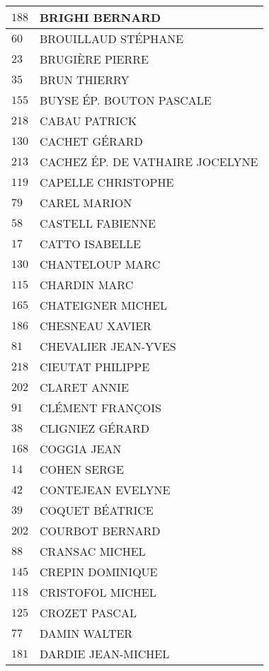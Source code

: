 \begin{xltabular}{\linewidth}{|l|X|}
    \hline
    $188$ & BRIGHI BERNARD \\
    \hline
    $60$ & BROUILLAUD STÉPHANE \\
    \hline
    $23$ & BRUGIÈRE PIERRE \\
    \hline
    $35$ & BRUN THIERRY \\
    \hline
    $155$ & BUYSE ÉP. BOUTON PASCALE \\
    \hline
    $218$ & CABAU PATRICK \\
    \hline
    $130$ & CACHET GÉRARD \\
    \hline
    $213$ & CACHEZ ÉP. DE VATHAIRE JOCELYNE \\
    \hline
    $119$ & CAPELLE CHRISTOPHE \\
    \hline
    $79$ & CAREL MARION \\
    \hline
    $58$ & CASTELL FABIENNE \\
    \hline
    $17$ & CATTO ISABELLE \\
    \hline
    $130$ & CHANTELOUP MARC \\
    \hline
    $115$ & CHARDIN MARC \\
    \hline
    $165$ & CHATEIGNER MICHEL \\
    \hline
    $186$ & CHESNEAU XAVIER \\
    \hline
    $81$ & CHEVALIER JEAN-YVES \\
    \hline
    $218$ & CIEUTAT PHILIPPE \\
    \hline
    $202$ & CLARET ANNIE \\
    \hline
    $91$ & CLÉMENT FRANÇOIS \\
    \hline
    $38$ & CLIGNIEZ GÉRARD \\
    \hline
    $168$ & COGGIA JEAN \\
    \hline
    $14$ & COHEN SERGE \\
    \hline
    $42$ & CONTEJEAN EVELYNE \\
    \hline
    $39$ & COQUET BÉATRICE \\
    \hline
    $202$ & COURBOT BERNARD \\
    \hline
    $88$ & CRANSAC MICHEL \\
    \hline
    $145$ & CREPIN DOMINIQUE \\
    \hline
    $118$ & CRISTOFOL MICHEL \\
    \hline
    $125$ & CROZET PASCAL \\
    \hline
    $77$ & DAMIN WALTER \\
    \hline
    $181$ & DARDIE JEAN-MICHEL \\

\end{xltabular}
